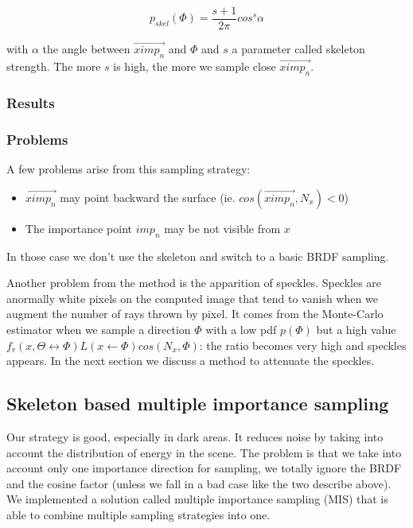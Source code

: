 \begin{equation*}
p_{skel}(\Phi) = \frac{s + 1}{2\pi} cos^s \alpha
\end{equation*}

with $\alpha$ the angle between $\vec{ximp_n}$ and $\Phi$ and $s$ a parameter called skeleton strength.  The more $s$ is high, the more we sample close $\vec{ximp_n}$.

\subsubsection{Results}

\subsubsection{Problems}

A few problems arise from this sampling strategy:

\begin{itemize}
\item $\vec{ximp_n}$ may point backward the surface (ie. $cos(\vec{ximp_n}, N_x) < 0$)
\item The importance point $imp_n$ may be not visible from $x$
\end{itemize}

In those case we don't use the skeleton and switch to a basic BRDF sampling.

Another problem from the method is the apparition of speckles. Speckles are anormally white pixels on the computed image that tend to vanish when we augment the number of rays thrown by pixel. It comes from the Monte-Carlo estimator when we sample a direction $\Phi$ with a low pdf $p(\Phi)$ but a high value $f_r(x, \Theta \leftrightarrow \Phi) L(x \leftarrow \Phi) cos(N_x, \Phi)$: the ratio becomes very high and speckles appears. In the next section we discuss a method to attenuate the speckles.

\subsection{Skeleton based multiple importance sampling}

Our strategy is good, especially in dark areas. It reduces noise by taking into account the distribution of energy in the scene. The problem is that we take into account only one importance direction for sampling, we totally ignore the BRDF and the cosine factor (unless we fall in a bad case like the two describe above). We implemented a solution called multiple importance sampling (MIS) that is able to combine multiple sampling strategies into one.

